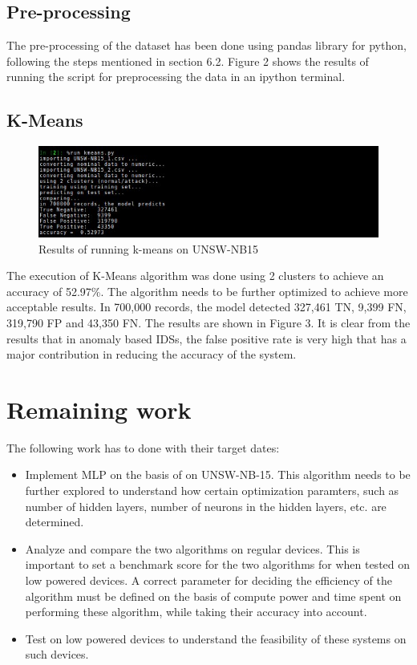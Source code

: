 \documentclass[a4paper,12pt]{article}
\begin{document}
        \subsection{Pre-processing}
        The pre-processing of the dataset has been done using pandas library for python, following the steps mentioned in section 6.2. Figure 2 shows the results of running the script for preprocessing the data in an ipython terminal.
        \subsection{K-Means}
        \begin{figure}[h!]
            \includegraphics[width=1\textwidth]{kmeans}
            \caption{Results of running k-means on UNSW-NB15}
        \end{figure}
        The execution of K-Means algorithm was done using 2 clusters to achieve an accuracy of 52.97\%. The algorithm needs to be further optimized to achieve more acceptable results. In 700,000 records, the model detected 327,461 TN, 9,399 FN, 319,790 FP and 43,350 FN. The results are shown in Figure 3. It is clear from the results that in anomaly based IDSs, the false positive rate is very high that has a major contribution in reducing the accuracy of the system.

    \section{Remaining work}
        The following work has to done with their target dates:
        \begin{itemize}
            \item Implement MLP on the basis of \cite{mlp17} on UNSW-NB-15. This algorithm needs to be further explored to understand how certain optimization paramters, such as number of hidden layers, number of neurons in the hidden layers, etc. are determined.
            \item Analyze and compare the two algorithms on regular devices. This is important to set a benchmark score for the two algorithms for when tested on low powered devices. A correct parameter for deciding the efficiency of the algorithm must be defined on the basis of compute power and time spent on performing these algorithm, while taking their accuracy into account.
            \item Test on low powered devices to understand the feasibility of these systems on such devices.
        \end{itemize}

	
	
	
\end{document}
